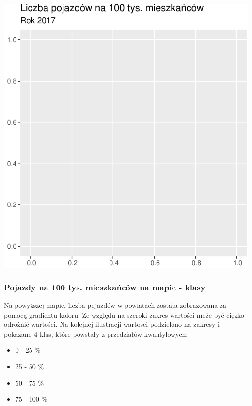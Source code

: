 \documentclass[
]{article}
\providecommand{\tightlist}{%
  \setlength{\itemsep}{0pt}\setlength{\parskip}{0pt}}
\begin{document}
\begin{flushleft}\includegraphics{raport_wypadki_files/figure-latex/unnamed-chunk-34-1} \end{flushleft}

\hypertarget{pojazdy-na-100-tys.-mieszkaux144cuxf3w-na-mapie---klasy}{%
\subsubsection{Pojazdy na 100 tys. mieszkańców na mapie -
klasy}\label{pojazdy-na-100-tys.-mieszkaux144cuxf3w-na-mapie---klasy}}

Na powyższej mapie, liczba pojazdów w powiatach została zobrazowana za
pomocą gradientu koloru. Ze względu na szeroki zakres wartości może być
ciężko odróżnić wartości. Na kolejnej ilustracji wartości podzielono na
zakresy i pokazano 4 klas, które powstały z przedziałów kwantylowych:

\begin{itemize}
\tightlist
\item
  0 - 25 \%
\item
  25 - 50 \%
\item
  50 - 75 \%
\item
  75 - 100 \%
\end{itemize}
\end{document}
